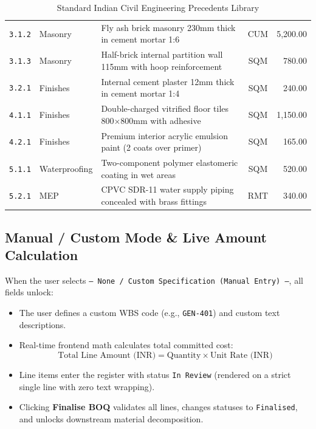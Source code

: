 \documentclass[11pt,a4paper]{article}
\begin{document}
\begin{table}[h!]
\begin{tabularx}{\textwidth}{l l l c r}
\texttt{3.1.2} & Masonry & Fly ash brick masonry 230mm thick in cement mortar 1:6 & CUM & 5,200.00 \\
\texttt{3.1.3} & Masonry & Half-brick internal partition wall 115mm with hoop reinforcement & SQM & 780.00 \\
\texttt{3.2.1} & Finishes & Internal cement plaster 12mm thick in cement mortar 1:4 & SQM & 240.00 \\
\texttt{4.1.1} & Finishes & Double-charged vitrified floor tiles 800$\times$800mm with adhesive & SQM & 1,150.00 \\
\texttt{4.2.1} & Finishes & Premium interior acrylic emulsion paint (2 coats over primer) & SQM & 165.00 \\
\texttt{5.1.1} & Waterproofing & Two-component polymer elastomeric coating in wet areas & SQM & 520.00 \\
\texttt{5.2.1} & MEP & CPVC SDR-11 water supply piping concealed with brass fittings & RMT & 340.00 \\
\bottomrule
\end{tabularx}
\caption{Standard Indian Civil Engineering Precedents Library}
\end{table}

\subsection{Manual / Custom Mode \& Live Amount Calculation}
When the user selects \texttt{-- None / Custom Specification (Manual Entry) --}, all fields unlock:
\begin{itemize}[noitemsep]
    \item The user defines a custom WBS code (e.g., \texttt{GEN-401}) and custom text descriptions.
    \item Real-time frontend math calculates total committed cost:
    \begin{equation}
        \text{Total Line Amount (INR)} = \text{Quantity} \times \text{Unit Rate (INR)}
    \end{equation}
    \item Line items enter the register with status \texttt{In Review} (rendered on a strict single line with zero text wrapping).
    \item Clicking \textbf{Finalise BOQ} validates all lines, changes statuses to \texttt{Finalised}, and unlocks downstream material decomposition.
\end{itemize}

\newpage

\end{document}
